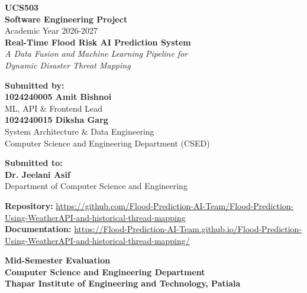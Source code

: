\documentclass[12pt,a4paper]{report}
\begin{document}
\begin{titlepage}
    \centering
    \vspace*{0.2cm}
    
    {\Large \textbf{UCS503}}\\[0.1cm]
    {\Large \textbf{Software Engineering Project}}\\[0.1cm]
    {\large Academic Year 2026-2027}\\[1.2cm]
    
    {\huge \bfseries Real-Time Flood Risk AI Prediction System}\\[0.4cm]
    {\Large \textit{A Data Fusion and Machine Learning Pipeline for}}\\[0.1cm]
    {\Large \textit{Dynamic Disaster Threat Mapping}}\\[1.2cm]
    
    \begin{flushleft}
        \textbf{Submitted by:}\\[0.2cm]
        \textbf{1024240005 Amit Bishnoi}\\
        ML, API \& Frontend Lead\\[0.4cm]
        \textbf{1024240015 Diksha Garg}\\
        System Architecture \& Data Engineering\\[0.4cm]
        Computer Science and Engineering Department (CSED)
    \end{flushleft}
    
    \vspace{0.5cm}
    
    \begin{flushleft}
        \textbf{Submitted to:}\\[0.2cm]
        \textbf{Dr. Jeelani Asif}\\
        Department of Computer Science and Engineering
    \end{flushleft}
    
    \vspace{0.5cm}
    
    \begin{flushleft}
        \small
        \textbf{Repository:} \url{https://github.com/Flood-Prediction-AI-Team/Flood-Prediction-Using-WeatherAPI-and-historical-thread-mapping}\\[0.3cm]
        \textbf{Documentation:} \url{https://Flood-Prediction-AI-Team.github.io/Flood-Prediction-Using-WeatherAPI-and-historical-thread-mapping/}
    \end{flushleft}
    
    \vfill
    
    {\Large \textbf{Mid-Semester Evaluation}}\\[0.3cm]
    {\Large \textbf{Computer Science and Engineering Department}}\\[0.3cm]
    {\Large \textbf{Thapar Institute of Engineering and Technology, Patiala}}
\end{titlepage}
\end{document}
